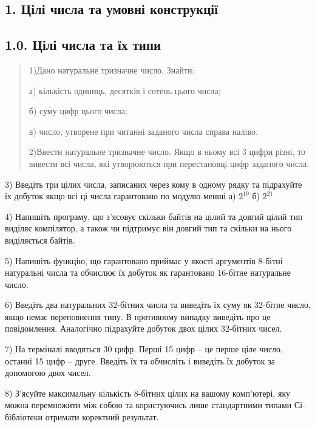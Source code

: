 \documentclass[]{article}
\begin{document}
\subsection{1. Цілі числа та умовні
конструкції}\label{ux446ux456ux43bux456-ux447ux438ux441ux43bux430-ux442ux430-ux443ux43cux43eux432ux43dux456-ux43aux43eux43dux441ux442ux440ux443ux43aux446ux456ux457}

\subsection{ 1.0. Цілі числа та їх
типи}\label{ux446ux456ux43bux456-ux447ux438ux441ux43bux430-ux442ux430-ux457ux445-ux442ux438ux43fux438}

\begin{quote}
1)Дано натуральне тризначне число. Знайти:

а) кількість одиниць, десятків і сотень цього числа;

б) суму цифр цього числа;

в) число, утворене при читанні заданого числа справа наліво.

2)Ввести натуральне тризначне число. Якщо в ньому всі 3 цифри різні, то
вивести всі числа, які утворюються при перестановці цифр заданого числа.
\end{quote}

3) Введіть три цілих числа, записаних через кому в одному рядку та
підрахуйте їх добуток якщо всі ці числа гарантовано по модулю менші а)
\(2^{10}\) б) \(2^{21}\)

4) Напишіть програму, що з'ясовує скільки байтів на цілий та довгий
цілий тип виділяє компілятор, а також чи підтримує він довгий тип та
скільки на нього виділяється байтів.

5) Напишіть функцію, що гарантовано приймає у якості аргументів 8-бітні
натуральні числа та обчислює їх добуток як гарантовано 16-бітне
натуральне число.

6) Введіть два натуральних 32-бітних числа та виведіть їх суму як
32-бітне число, якщо немає переповнення типу. В противному випадку
виведіть про це повідомлення. Аналогічно підрахуйте добуток двох цілих
32-бітних чисел.

7) На терміналі вводяться 30 цифр. Перші 15 цифр -- це перше ціле число,
останні 15 цифр -- друге. Введіть їх та обчисліть і виведіть їх добуток
за допомогою двох чисел.

8) З'ясуйте максимальну кількість 8-бітних цілих на вашому комп'ютері,
яку можна перемножити між собою та користуючись лише стандартними типами
Сі-бібліотеки отримати коректний результат.
\end{document}
